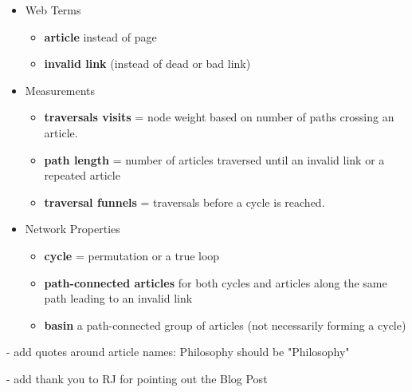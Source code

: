 \documentclass[twoside]{article}
\newcommand{\bt}[1]{\textbf{#1}} %
\begin{document}
\begin{itemize}
\item Web Terms
    \begin{itemize}
        \item \bt{article} instead of page
        \item \bt{invalid link} (instead of dead or bad link)
    \end{itemize}
\item Measurements
    \begin{itemize}
        \item \bt{traversals visits} = node weight based on number of paths crossing an article.
        \item \bt{path length} = number of articles traversed until an invalid link or a repeated article
        \item \bt{traversal funnels} = traversals before a cycle is reached.
    \end{itemize}
\item Network Properties
    \begin{itemize}
        \item \bt{cycle} = permutation or a true loop
        \item \bt{path-connected articles} for both cycles and articles along the same path leading to an 
    invalid link
        \item \bt{basin} a path-connected group of articles (not necessarily forming a cycle)
    \end{itemize}
\end{itemize}

- add quotes around article names: Philosophy should be "Philosophy"

- add thank you to RJ for pointing out the Blog Post
\end{document}
